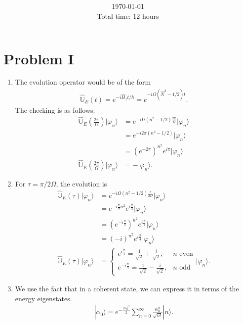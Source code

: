 \documentclass[letterpaper,11pt,twoside]{article}
\title{\textbf{\assignment}\\\course\\{\Large\institution}}
\author{\autor}
\date{\today\\Total time: 12 hours}
\newcommand{\ket}[1]{|#1\rangle}
\begin{document}
\pagestyle{mainstyle}
\maketitle
\section*{Problem I}
\begin{enumerate}[itemsep=0pt,topsep=0pt,label=\alph*)]
  \item The evolution operator would be of the form 
  \begin{align*}
    \hat{\mathbb{U}}_E(t)=e^{-i\hat{H}_1t/\hbar}=e^{-i\Omega(\hat{N}^2-1/2)t}.
  \end{align*}
  The checking is as follows:
  \begin{align*}
    \hat{\mathbb{U}}_E(\frac{2\pi}{\Omega})\ket{\varphi_n}&=e^{-i\Omega(n^2-1/2)\frac{2\pi}{\Omega}}\ket{\varphi_n}\\
    &=e^{-i2\pi(n^2-1/2)}\ket{\varphi_n}\\
    &=(e^{-2\pi})^{n^2}e^{i\pi}\ket{\varphi_n}\\
    \hat{\mathbb{U}}_E(\frac{2\pi}{\Omega})\ket{\varphi_n}&=-\ket{\varphi_n}.
  \end{align*}
  \item For $\tau=\pi/2\Omega$, the evolution is 
  \begin{align*}
    \hat{\mathbb{U}}_E(\tau)\ket{\varphi_n}&=e^{-i\Omega(n^2-1/2)\frac{\pi}{2\Omega}}\ket{\varphi_n}\\
    &=e^{-i\frac{\pi}{2}n^2}e^{i\frac{\pi}{4}}\ket{\varphi_n}\\
    &=(e^{-i\frac{\pi}{2}})^{n^2}e^{i\frac{\pi}{4}}\ket{\varphi_n}\\
    &=(-i)^{n^2}e^{i\frac{\pi}{4}}\ket{\varphi_n}\\
   \hat{\mathbb{U}}_E(\tau)\ket{\varphi_n}&=\begin{cases}
      e^{i\frac{\pi}{4}}=\frac{1}{\sqrt{2}}+\frac{i}{\sqrt{2}},&\text{$n$ even}\\
      e^{-i\frac{\pi}{4}}=\frac{1}{\sqrt{2}}-\frac{i}{\sqrt{2}},&\text{$n$ odd}
    \end{cases}\ket{\varphi_n}.
  \end{align*}
  \item We use the fact that in a coherent state, we can express it in terms of the energy eigenstates.
  \begin{align*}
    \ket{\alpha_0}=e^{-\frac{|\alpha_0|^2}{2}}\sum_{n=0}^\infty\frac{\alpha_0^n}{\sqrt{n!}}\ket{n}.

\end{align*}
\end{enumerate}
\end{document}
